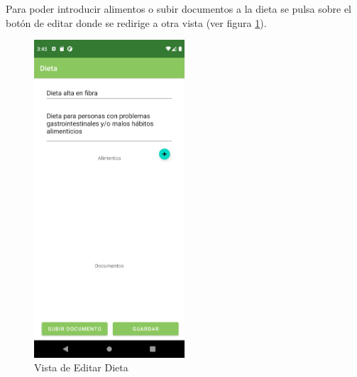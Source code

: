 Para poder introducir alimentos o subir documentos a la dieta se pulsa sobre el botón de editar donde se redirige a otra vista (ver figura \ref{fig:editardieta}). 
\begin{figure}[H]
    \centering
    \includegraphics[width=0.5\textwidth]{Images/Capitulo7/editardieta.png}
        \caption{Vista de Editar Dieta}
    \label{fig:editardieta}
\end{figure}


